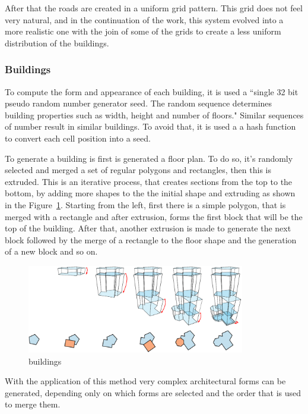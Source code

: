 After that the roads are created in a uniform grid pattern. This grid does not feel very natural, and in the continuation of the work, this system evolved into a more realistic one with the join of some of the grids to create a less uniform distribution of the buildings.


\subsubsection{Buildings} %
\label{ssub:buildings}


To compute the form and appearance of each building, it is used a ``single 32 bit pseudo random number generator seed. The random sequence determines building properties such as width, height and number of floors."
Similar sequences of number result in similar buildings. To avoid that, it is used a a hash function to convert each cell position into a seed.

To generate a building is first is generated a floor plan. To do so, it's randomly selected and merged a set of regular polygons and rectangles, then this is extruded. This is an iterative process, that creates sections from the top to the bottom, by adding more shapes to the the initial shape and extruding as shown in the Figure~\ref{fig:UC_buildings}. Starting from the left, first there is a simple polygon, that is merged with a rectangle and after extrusion, forms the first block that will be the top of the building. After that, another extrusion is made to generate the next block followed by the merge of a rectangle to the floor shape and the generation of a new block and so on.

\begin{figure}[htbp]
	\centering
	\includegraphics[width=0.85\textwidth]{img/Real-Time-procedural-generation/Building-Generation.png}
	\caption{buildings}
	\label{fig:UC_buildings}
\end{figure}

With the application of this method very complex architectural forms can be generated, depending only on which forms are selected and the order that is used to merge them.


